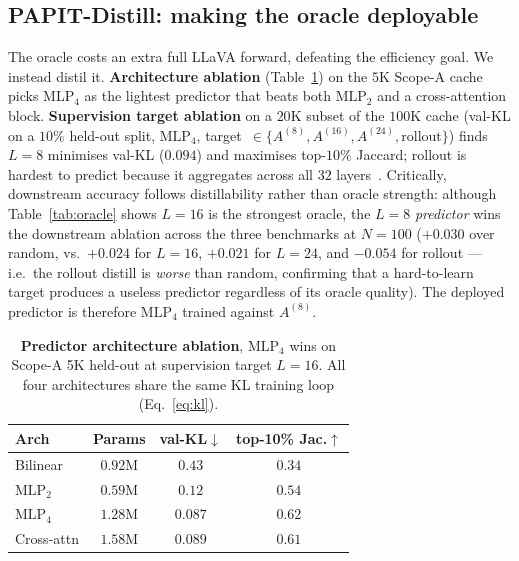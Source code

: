 \documentclass[10pt,twocolumn,letterpaper]{article}
\begin{document}
\subsection{PAPIT-Distill: making the oracle deployable}
\label{sec:distill}

The oracle costs an extra full LLaVA forward, defeating the efficiency
goal. We instead distil it. \textbf{Architecture ablation}
(Table~\ref{tab:arch}) on the $5$K Scope-A cache picks $\mathrm{MLP}_4$
as the lightest predictor that beats both $\mathrm{MLP}_2$ and a
cross-attention block. \textbf{Supervision target ablation} on a
$20$K subset of the $100$K cache (val-KL on a $10\%$ held-out split,
$\mathrm{MLP}_4$, target~$\in\!\{A^{(8)},A^{(16)},A^{(24)},
\text{rollout}\}$) finds $L{=}8$ minimises val-KL ($0.094$) and
maximises top-$10\%$ Jaccard; rollout is hardest to predict because
it aggregates across all $32$ layers~\cite{abnar2020rollout}.
Critically, downstream accuracy follows distillability rather than
oracle strength: although Table~\ref{tab:oracle} shows $L{=}16$ is
the strongest oracle, the $L{=}8$ \emph{predictor} wins the
downstream ablation across the three benchmarks at
$N{=}100$ ($+0.030$ over random, vs.\ $+0.024$ for $L{=}16$,
$+0.021$ for $L{=}24$, and $-0.054$ for rollout — i.e.\ the rollout
distill is \emph{worse} than random, confirming that a hard-to-learn
target produces a useless predictor regardless of its oracle
quality). The deployed predictor is therefore $\mathrm{MLP}_4$
trained against $A^{(8)}$.

\begin{table}[t]
\centering
\small
\caption{\textbf{Predictor architecture ablation}, $\mathrm{MLP}_4$ wins
on Scope-A 5K held-out at supervision target $L{=}16$. All four
architectures share the same KL training loop (Eq.~\ref{eq:kl}).}
\label{tab:arch}
\begin{tabular}{@{}lccc@{}}
\toprule
Arch & Params & val-KL$\downarrow$ & top-10\% Jac.$\uparrow$ \\
\midrule
Bilinear            & $0.92$M & $0.43$  & $0.34$ \\
$\mathrm{MLP}_2$    & $0.59$M & $0.12$  & $0.54$ \\
\textbf{$\mathrm{MLP}_4$} & $1.28$M & $\mathbf{0.087}$ & $\mathbf{0.62}$ \\
Cross-attn          & $1.58$M & $0.089$  & $0.61$ \\
\bottomrule
\end{tabular}
\end{table}
\end{document}
